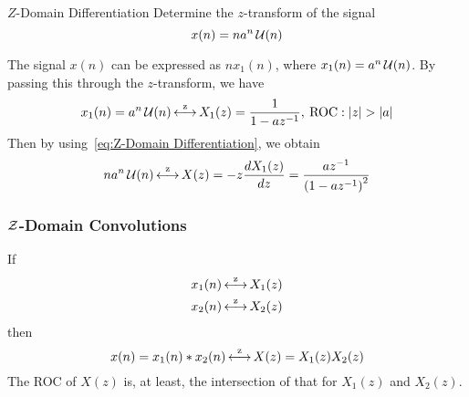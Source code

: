\begin{example}[Example 3.2.7]{\texorpdfstring{$Z$-Domain}{Z-Domain} Differentiation}
  Determine the $z$-transform of the signal
  \begin{equation*}
    x(n) = na^{n}\operatorname{\mathcal{U}}(n)
  \end{equation*}

  \tcblower

  The signal $x(n)$ can be expressed as $nx_{1}(n)$, where $x_{1}(n) = a^{n}\operatorname{\mathcal{U}}(n)$.
  By passing this through the $z$-transform, we have
  \begin{equation*}
    x_{1}(n) = a^{n}\operatorname{\mathcal{U}}(n) \operatorname{\overset{z}{\longleftrightarrow}} X_{1}(z) = \frac{1}{1-az^{-1}}, \> \operatorname{\mathrm{ROC}}: \lvert z \rvert > \lvert a \rvert
  \end{equation*}
  Then by using~\eqref{eq:Z-Domain Differentiation}, we obtain
  \begin{equation*}
    na^{n} \operatorname{\mathcal{U}}(n) \operatorname{\overset{z}{\longleftrightarrow}} X(z) = -z \frac{dX_{1}(z)}{dz} = \frac{az^{-1}}{{\left( 1-az^{-1}\right)}^{2}}
  \end{equation*}
\end{example}

\subsubsection{\texorpdfstring{$\operatorname{\mathcal{Z}}$-Domain}{Z-Domain} Convolutions}\label{subsubsec:Z-Domain Convolutions}
If
\begin{equation*}
  \begin{aligned}
    x_{1}(n) &\operatorname{\overset{z}{\longleftrightarrow}} X_{1}(z) \\
    x_{2}(n) &\operatorname{\overset{z}{\longleftrightarrow}} X_{2}(z) \\
  \end{aligned}
\end{equation*}
then
\begin{equation}\label{eq:Z-Domain Convolutions}
  x(n) = x_{1}(n) * x_{2}(n) \operatorname{\overset{z}{\longleftrightarrow}} X(z) = X_{1}(z)X_{2}(z)
\end{equation}
The ROC of $X(z)$ is, at least, the intersection of that for $X_{1}(z)$ and $X_{2}(z)$.


